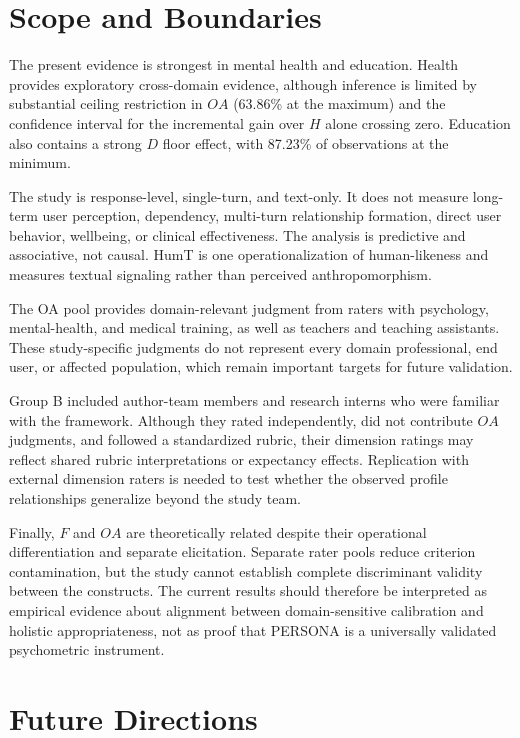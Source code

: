 \documentclass[manuscript,review,anonymous]{acmart}
\begin{document}
\section{Scope and Boundaries}

The present evidence is strongest in mental health and education. Health provides exploratory cross-domain evidence, although inference is limited by substantial ceiling restriction in $OA$ (63.86\% at the maximum) and the confidence interval for the incremental gain over $H$ alone crossing zero. Education also contains a strong $D$ floor effect, with 87.23\% of observations at the minimum.

The study is response-level, single-turn, and text-only. It does not measure long-term user perception, dependency, multi-turn relationship formation, direct user behavior, wellbeing, or clinical effectiveness. The analysis is predictive and associative, not causal. HumT is one operationalization of human-likeness and measures textual signaling rather than perceived anthropomorphism.

The OA pool provides domain-relevant judgment from raters with psychology, mental-health, and medical training, as well as teachers and teaching assistants. These study-specific judgments do not represent every domain professional, end user, or affected population, which remain important targets for future validation.

Group B included author-team members and research interns who were familiar with the framework. Although they rated independently, did not contribute $OA$ judgments, and followed a standardized rubric, their dimension ratings may reflect shared rubric interpretations or expectancy effects. Replication with external dimension raters is needed to test whether the observed profile relationships generalize beyond the study team.

Finally, $F$ and $OA$ are theoretically related despite their operational differentiation and separate elicitation. Separate rater pools reduce criterion contamination, but the study cannot establish complete discriminant validity between the constructs. The current results should therefore be interpreted as empirical evidence about alignment between domain-sensitive calibration and holistic appropriateness, not as proof that PERSONA is a universally validated psychometric instrument.

\section{Future Directions}
\end{document}

